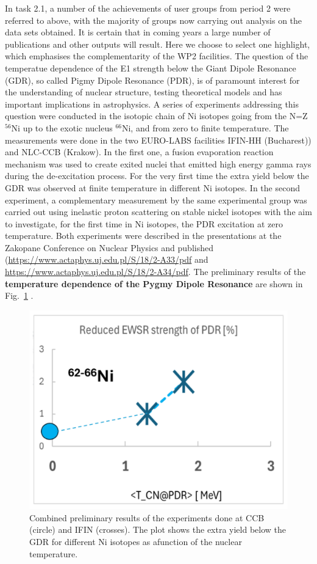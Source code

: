 In task 2.1, a number of the achievements of user groups from period 2 were referred to above, with the majority of groups now carrying out analysis on the data sets obtained. It is certain that in coming years a large number of publications and other outputs will result. Here we choose to select one highlight, which emphasises the complementarity of the WP2 facilities. 
The question of the temperatue dependence of the E1 strength below the Giant Dipole Resonance (GDR), so called Pigmy Dipole Resonance (PDR), is of paramount interest for the understanding of nuclear structure, testing theoretical models and has important implications in astrophysics. A series of experiments addressing this question were conducted in the isotopic chain of Ni isotopes going from the N=Z $^{56}$Ni up to the exotic nucleus $^{66}$Ni, and from zero to finite temperature. The measurements were done in the two EURO-LABS facilities IFIN-HH (Bucharest)) and NLC-CCB (Krakow). In the first one, a fusion evaporation reaction mechanism was used to create exited nuclei that emitted high energy gamma rays during the de-excitation process.
For the very first time the extra yield below the GDR was observed at finite temperature in different Ni isotopes. In the second experiment, a complementary measurement by the same experimental group was carried out using inelastic proton scattering on stable nickel isotopes with the aim to investigate, for the first time in Ni isotopes, the PDR excitation 
at zero temperature. 
Both experiments were described in the presentations at the Zakopane Conference on Nuclear Physics and published ({\url{https://www.actaphys.uj.edu.pl/S/18/2-A33/pdf} and \url{https://www.actaphys.uj.edu.pl/S/18/2-A34/pdf}. The preliminary results of the \textbf{temperature dependence of the Pygmy Dipole Resonance} are shown in Fig.~\ref{fig:Wieland} }.

\begin{figure}[!h]
    \centering
    \includegraphics[width=0.6\linewidth]{graphics/Wieland.png}
    \caption{Combined preliminary results of the experiments done at CCB (circle) and IFIN (crosses). The plot shows the extra yield below the GDR for different Ni isotopes as afunction of the nuclear temperature.
}
    \label{fig:Wieland}
\end{figure}


